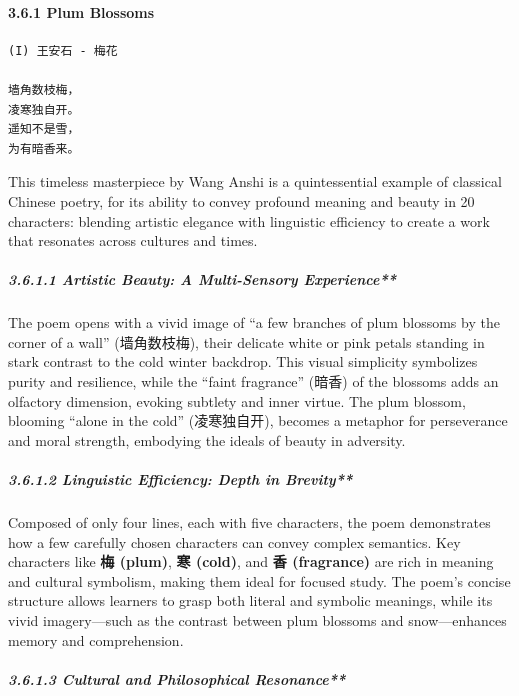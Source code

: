 \documentclass[
  11pt,
  letterpaper,
]{article}
\begin{document}
\hypertarget{plum-blossoms}{%
\paragraph{3.6.1 Plum Blossoms}\label{plum-blossoms}}

\begin{verbatim}
(I) 王安石 - 梅花

墙角数枝梅，
凌寒独自开。
遥知不是雪，
为有暗香来。
\end{verbatim}

This timeless masterpiece by Wang Anshi is a quintessential example of
classical Chinese poetry, for its ability to convey profound meaning and
beauty in 20 characters: blending artistic elegance with linguistic
efficiency to create a work that resonates across cultures and times.

\hypertarget{artistic-beauty-a-multi-sensory-experience}{%
\subparagraph{3.6.1.1 Artistic Beauty: A Multi-Sensory
Experience**}\label{artistic-beauty-a-multi-sensory-experience}}

The poem opens with a vivid image of ``a few branches of plum blossoms
by the corner of a wall'' (墙角数枝梅), their delicate white or pink
petals standing in stark contrast to the cold winter backdrop. This
visual simplicity symbolizes purity and resilience, while the ``faint
fragrance'' (暗香) of the blossoms adds an olfactory dimension, evoking
subtlety and inner virtue. The plum blossom, blooming ``alone in the
cold'' (凌寒独自开), becomes a metaphor for perseverance and moral
strength, embodying the ideals of beauty in adversity.

\hypertarget{linguistic-efficiency-depth-in-brevity}{%
\subparagraph{3.6.1.2 Linguistic Efficiency: Depth in
Brevity**}\label{linguistic-efficiency-depth-in-brevity}}

Composed of only four lines, each with five characters, the poem
demonstrates how a few carefully chosen characters can convey complex
semantics. Key characters like \textbf{梅 (plum)}, \textbf{寒 (cold)},
and \textbf{香 (fragrance)} are rich in meaning and cultural symbolism,
making them ideal for focused study. The poem's concise structure allows
learners to grasp both literal and symbolic meanings, while its vivid
imagery---such as the contrast between plum blossoms and snow---enhances
memory and comprehension.

\hypertarget{cultural-and-philosophical-resonance}{%
\subparagraph{3.6.1.3 Cultural and Philosophical
Resonance**}\label{cultural-and-philosophical-resonance}}
\end{document}
